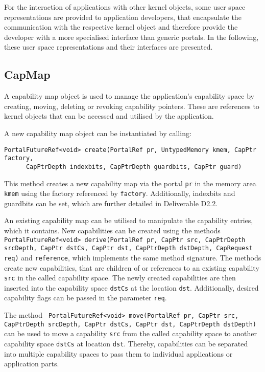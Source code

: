 For the interaction of applications with other kernel objects, some user space
representations are provided to application developers, that encapsulate the
communication with the respective kernel object and therefore provide the
developer with a more specialised interface than generic portals. In the
following, these user space representations and their interfaces are presented.

\subsection{CapMap}

A capability map object is used to manage the application's capability space by
creating, moving, deleting or revoking capability pointers. These are references
to kernel objects that can be accessed and utilised by the application.

A new capability map object can be instantiated by calling:
\lstset{language=c++,numbers=none}
\begin{lstlisting}
PortalFutureRef<void> create(PortalRef pr, UntypedMemory kmem, CapPtr factory,
      CapPtrDepth indexbits, CapPtrDepth guardbits, CapPtr guard)
\end{lstlisting}

This method creates a new capability map via the portal \texttt{pr} in the memory
area \texttt{kmem} using the factory referenced by \texttt{factory}.
Additionally, indexbits and guardbits can be set, which are further detailed in
Deliverable D2.2.

An existing capability map can be utilised to manipulate the capability entries,
which it contains. New capabilities can be created using the methods
\texttt{PortalFutureRef<void> derive(PortalRef pr, CapPtr src, CapPtrDepth
srcDepth, CapPtr dstCs, CapPtr dst, CapPtrDepth dstDepth, CapRequest req)} and
\texttt{reference}, which implements the same method signature.  The methods
create new capabilities, that are children of or references to an existing
capability \texttt{src} in the called capability space. The newly created
capabilities are then inserted into the capability space \texttt{dstCs} at the
location \texttt{dst}. Additionally, desired capability flags can be passed in
the parameter \texttt{req}.

The method \texttt{ PortalFutureRef<void> move(PortalRef pr, CapPtr src,
\\CapPtrDepth srcDepth, CapPtr dstCs, CapPtr dst, CapPtrDepth dstDepth)} can be
used to move a capability \texttt{src} from the called capability space to
another capability space \texttt{dstCs} at location \texttt{dst}. Thereby,
capabilities can be separated into multiple capability spaces to pass them to
individual applications or application parts.

